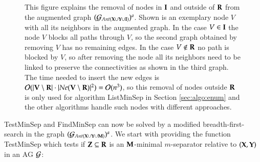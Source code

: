 \def\dicefive#1{ 
  \node[] (M) at (0,0.5) {$V$};   
  \node[#1,color=red, cross out] at (M) {};
  \node[] (A) at (-1,-1) {$N$};   
  \node[] (B) at (1,-1) {$M$};   
  \node[] (C) at (-1,1) {$O$};   
  \node[] (D) at (1,1) {$P$};   
}
\begin{figure}\centering
{}
\caption{This figure explains the removal of nodes in ${\bf I}$ and outside of ${\bf R}$ from the augmented graph $({\cal G}_{\textit{Ant}({\bf X}\cup{\bf Y}\cup{\bf I})})^a$. Shown is an exemplary node $V$ with all its neighbors in the  augmented graph. In the case $V \in {\bf I}$ the node $V$ blocks all paths through $V$, so the second graph obtained by removing  $V$ has no remaining edges.
In the case $V \notin {\bf R}$ no path is blocked by $V$, so after removing the node all its neighbors need to be linked to preserve the connectivities as shown in the third graph.
%
%
%
The time  needed to insert the new edges is ${\cal O}(|{\bf V}\setminus{\bf R}| \cdot |\textit{Ne}({\bf V}\setminus{\bf R})|^2) = {\cal O}(n^3)$, so this removal of nodes outside ${\bf R}$ is only used for algorithm {\sc ListMinSep} in Section \ref{sec:algo:enum} and the other algorithms handle such nodes with different approaches.
}\label{fig:removeIR}
\end{figure}

{\sc TestMinSep} and {\sc FindMinSep}  can now be solved by a modified breadth-first-search in the graph $({\cal G}_{\textit{Ant}({\bf X}\cup{\bf Y}\cup{\bf M})})^a$. We start with providing the function {\sc TestMinSep}
which tests if ${\bf Z}\subseteq {\bf R}$ is an ${\bf M}$-minimal $m$-separator relative to $({\bf X},{\bf Y})$ in an AG ${\cal G}$:


